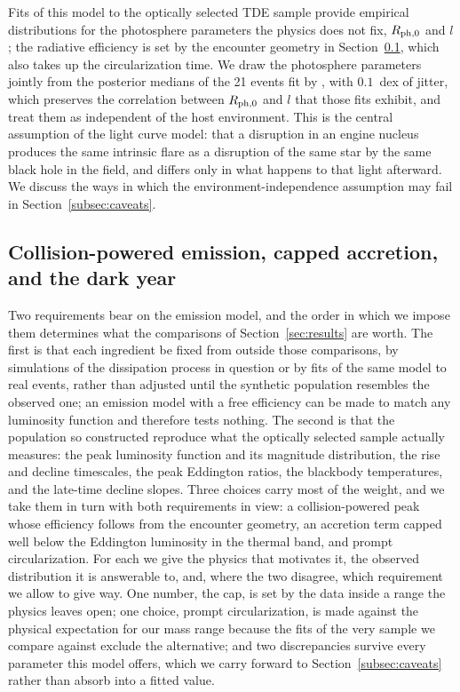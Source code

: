\documentclass[twocolumn,pdftex]{aastex701}
\begin{document}
Fits of this model to the optically selected TDE sample \citep{Mockler:2019a,Nicholl:2022a,Hammerstein:2023a} provide empirical distributions for the photosphere parameters the physics does not fix, $R_{\rm ph,0}$ and $l$; the radiative efficiency is set by the encounter geometry in Section~\ref{subsec:darkyear}, which also takes up the circularization time. We draw the photosphere parameters jointly from the posterior medians of the 21 events fit by \citet{Nicholl:2022a}, with $0.1$~dex of jitter, which preserves the correlation between $R_{\rm ph,0}$ and $l$ that those fits exhibit, and treat them as independent of the host environment. This is the central assumption of the light curve model: that a disruption in an engine nucleus produces the same intrinsic flare as a disruption of the same star by the same black hole in the field, and differs only in what happens to that light afterward. We discuss the ways in which the environment-independence assumption may fail in Section~\ref{subsec:caveats}.

\subsection{Collision-powered emission, capped accretion, and the dark year}\label{subsec:darkyear}

Two requirements bear on the emission model, and the order in which we impose them determines what the comparisons of Section~\ref{sec:results} are worth. The first is that each ingredient be fixed from outside those comparisons, by simulations of the dissipation process in question or by fits of the same model to real events, rather than adjusted until the synthetic population resembles the observed one; an emission model with a free efficiency can be made to match any luminosity function and therefore tests nothing. The second is that the population so constructed reproduce what the optically selected sample actually measures: the peak luminosity function and its magnitude distribution, the rise and decline timescales, the peak Eddington ratios, the blackbody temperatures, and the late-time decline slopes. Three choices carry most of the weight, and we take them in turn with both requirements in view: a collision-powered peak whose efficiency follows from the encounter geometry, an accretion term capped well below the Eddington luminosity in the thermal band, and prompt circularization. For each we give the physics that motivates it, the observed distribution it is answerable to, and, where the two disagree, which requirement we allow to give way. One number, the cap, is set by the data inside a range the physics leaves open; one choice, prompt circularization, is made against the physical expectation for our mass range because the fits of the very sample we compare against exclude the alternative; and two discrepancies survive every parameter this model offers, which we carry forward to Section~\ref{subsec:caveats} rather than absorb into a fitted value.
\end{document}
